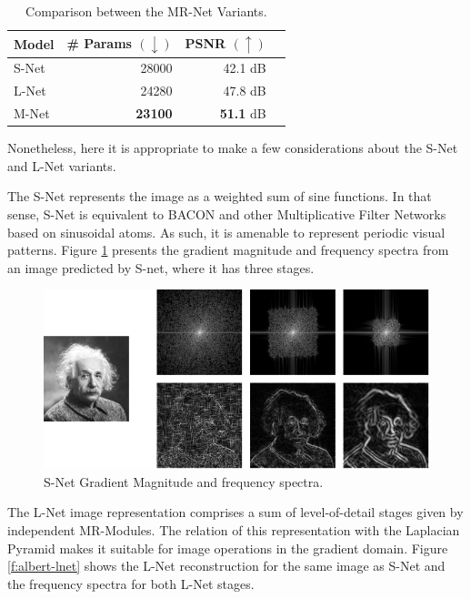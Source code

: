 \begin{table}[!h]
\centering
\small
\begin{tabular}{|l|r|r|r|}
\hline
Model & \# Params $(\downarrow)$ & PSNR $(\uparrow)$  \\
\hline
S-Net & 28000 & 42.1 dB  \\
L-Net & 24280 & 47.8 dB \\
M-Net & {\bf 23100} & {\bf 51.1} dB   \\
\hline
\end{tabular}
\vspace{-0.3cm}
\caption{\label{tab:comp} Comparison between the MR-Net Variants.}
\label{t:comp_variantes}
\end{table}

Nonetheless, here it is appropriate to make a few considerations about the S-Net and L-Net variants.

The S-Net represents the image as a weighted sum of sine functions. In that sense, S-Net is equivalent to BACON and other Multiplicative Filter Networks based on sinusoidal atoms. As such, it is amenable to represent periodic visual patterns. Figure \ref{f:albert-snet} presents the gradient magnitude and frequency spectra from an image predicted by S-net, where it has three stages.

\begin{figure}[!h]
\centering
\includegraphics[width=0.9\linewidth]{img/ch5/albert.png}
\caption{S-Net Gradient Magnitude and frequency spectra.}
\label{f:albert-snet}
\end{figure}


The L-Net image representation comprises a sum of level-of-detail stages given by independent MR-Modules. The relation of this representation with the Laplacian Pyramid makes it suitable for image operations in the gradient domain. Figure \ref{f:albert-lnet} shows the L-Net reconstruction for the same image as S-Net and the frequency spectra for both L-Net stages. 

